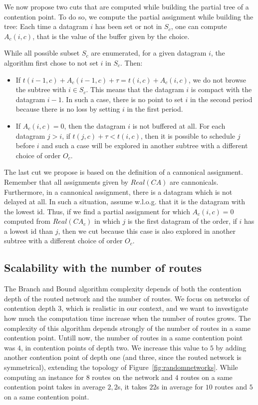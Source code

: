 We now propose two cuts that are computed while building the partial tree of a contention point. To do so, we compute the partial assignment while building the tree: Each time a datagram $i$ has been set or not in $S_c$, one can compute $A_{c}(i,c)$, that is the value of the buffer given by the choice.

While all possible subset $S_c$ are enumerated, for a given datagram $i$, the algorithm first chose to not set $i$ in $S_c$. Then:
\begin{itemize}
 \item If $t(i-1,c) + A_{c}(i-1,c) + \tau = t(i,c) + A_{c}(i,c)$, we do not browse the subtree with $i \in S_c$. This means that the datagram $i$ is compact with the datagram $i-1$. In such a case, there is no point to set $i$ in the second period because there is no loss by setting $i$ in the first period.

\item If $A_{c}(i,c) = 0$, then the datagram $i$ is not buffered at all. For each datagram $j>i$, if $t(j,c) + \tau < t(i,c)$, then it is possible to schedule $j$ before $i$ and such a case will be explored in another subtree with a different choice of order $O_c$.

\end{itemize}


The last cut we propose is based on the definition of a cannonical assignment. Remember that all assignments given by $Real(CA)$ are cannonicals. Furthermore, in a cannonical assignment, there is a datagram which is not delayed at all. In such a situation, assume w.l.o.g. that it is the datagram with the lowest id. Thus, if we find a partial assignment for which $A_{c}(i,c) = 0$ computed from $Real(CA_c)$ in which $j$ is the first datagram of the order, if $i$ has a lowest id than $j$, then we cut because this case is also explored in another subtree with a different choice of order $O_c$.

\subsection{Scalability with the number of routes}

The Branch and Bound algorithm complexity depends of both the contention depth of the routed network and the number of routes. We focus on networks of contention depth $3$, which is realistic in our context, and we want to investigate how much the computation time increase when the number of routes grows. The complexity of this algorithm depends strongly of the number of routes in a same contention point. Untill now, the number of routes in a same contention point was $4$, in contention points of depth two. We increase this value to $5$ by adding another contention point of depth one (and three, since the routed network is symmetrical), extending the topology of Figure~\ref{fig:randomnetworks}. While computing an instance for $8$ routes on the network and $4$ routes on a same contention point takes in average $2,2$s, it takes $22$s in average for $10$ routes and $5$ on a same contention point. 



